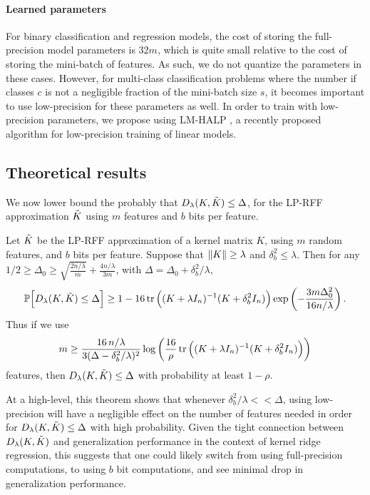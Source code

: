 \paragraph{Learned parameters} For binary classification and regression models, the cost of storing the full-precision model parameters is $32m$, which is quite small relative to the cost of storing the mini-batch of features. As such, we do not quantize the parameters in these cases. However, for multi-class classification problems where the number if classes $c$ is not a negligible fraction of the mini-batch size $s$, it becomes important to use low-precision for these parameters as well. In order to train with low-precision parameters, we propose using LM-HALP \citep{halp18}, a recently proposed algorithm for low-precision training of linear models.


\subsection{Theoretical results}
We now lower bound the probably that $D_{\lambda}(K,\tilde{K}) \leq \Delta$, for the LP-RFF approximation $\tilde{K}$ using $m$ features and $b$ bits per feature.

\begin{theorem}
	Let $\tilde{K}$ be the LP-RFF approximation of a kernel matrix $K$, using $m$ random features, and $b$ bits per feature. Suppose that $\|K\| \geq \lambda$ and $\delta^2_b \leq \lambda$.
	Then for any $1/2 \geq \Delta_0 \geq \sqrt{\frac{2n/\lambda}{m}} + \frac{4n/\lambda}{3m}$, with $\Delta =
	\Delta_0 + \delta^2_b / \lambda$,
	\begin{equation*}
	\mathbb{P}\Big[D_{\lambda}(K,\tilde{K}) \leq \Delta\Big] \geq 1 - 16 \mathop{\rm tr}\Big((K +
	\lambda I_n)^{-1} (K + \delta^2_b I_n)\Big) \exp \left( -\frac{3m \Delta_0^2}{16n/\lambda} \right).
	\end{equation*}
	Thus if we use 
	\begin{equation*}
	m \geq \frac{16\, n/\lambda}{3(\Delta - \delta_b^2/\lambda)^{2}} \log \bigg(\frac{16}{\rho} \mathop{\rm tr}\Big((K + \lambda I_n)^{-1} (K + \delta^2_b I_n)\Big) \bigg)
	\end{equation*}
	features, then $D_{\lambda}(K,\tilde{K}) \leq \Delta$	with probability at least $1 - \rho$.
\end{theorem}

At a high-level, this theorem shows that whenever $\delta_b^2/\lambda << \Delta$, using low-precision will have a negligible effect on the number of features needed in order for $D_{\lambda}(K,\tilde{K}) \leq \Delta$ with high probability.  Given the tight connection between $D_{\lambda}(K,\tilde{K})$ and generalization performance in the context of kernel ridge regression, this suggests that one could likely switch from using full-precision computations, to using $b$ bit computations, and see minimal drop in generalization performance.

